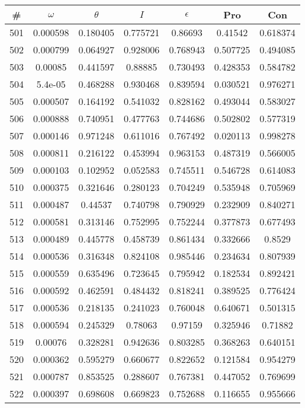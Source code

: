 \newpage
\begin{table}
\begin{tabular}{c|c|c|c|c|c|c}
\# & $\omega$ & $\theta$ & $I$ & $\epsilon$ & Pro & Con\\
\hline
501 & 0.000598 & 0.180405 & 0.775721 & 0.86693 & 0.41542 & 0.618374\\
502 & 0.000799 & 0.064927 & 0.928006 & 0.768943 & 0.507725 & 0.494085\\
503 & 0.00085 & 0.441597 & 0.88885 & 0.730493 & 0.428353 & 0.584782\\
504 & 5.4e-05 & 0.468288 & 0.930468 & 0.839594 & 0.030521 & 0.976271\\
505 & 0.000507 & 0.164192 & 0.541032 & 0.828162 & 0.493044 & 0.583027\\
506 & 0.000888 & 0.740951 & 0.477763 & 0.744686 & 0.502802 & 0.577319\\
507 & 0.000146 & 0.971248 & 0.611016 & 0.767492 & 0.020113 & 0.998278\\
508 & 0.000811 & 0.216122 & 0.453994 & 0.963153 & 0.487319 & 0.566005\\
509 & 0.000103 & 0.102952 & 0.052583 & 0.745511 & 0.546728 & 0.614083\\
510 & 0.000375 & 0.321646 & 0.280123 & 0.704249 & 0.535948 & 0.705969\\
511 & 0.000487 & 0.44537 & 0.740798 & 0.790929 & 0.232909 & 0.840271\\
512 & 0.000581 & 0.313146 & 0.752995 & 0.752244 & 0.377873 & 0.677493\\
513 & 0.000489 & 0.445778 & 0.458739 & 0.861434 & 0.332666 & 0.8529\\
514 & 0.000536 & 0.316348 & 0.824108 & 0.985446 & 0.234634 & 0.807939\\
515 & 0.000559 & 0.635496 & 0.723645 & 0.795942 & 0.182534 & 0.892421\\
516 & 0.000592 & 0.462591 & 0.484432 & 0.818241 & 0.389525 & 0.776424\\
517 & 0.000536 & 0.218135 & 0.241023 & 0.760048 & 0.640671 & 0.501315\\
518 & 0.000594 & 0.245329 & 0.78063 & 0.97159 & 0.325946 & 0.71882\\
519 & 0.00076 & 0.328281 & 0.942636 & 0.803285 & 0.368263 & 0.640151\\
520 & 0.000362 & 0.595279 & 0.660677 & 0.822652 & 0.121584 & 0.954279\\
521 & 0.000787 & 0.853525 & 0.288607 & 0.767381 & 0.447052 & 0.769699\\
522 & 0.000397 & 0.698608 & 0.669823 & 0.752688 & 0.116655 & 0.955666\\

\end{tabular}
\end{table}

